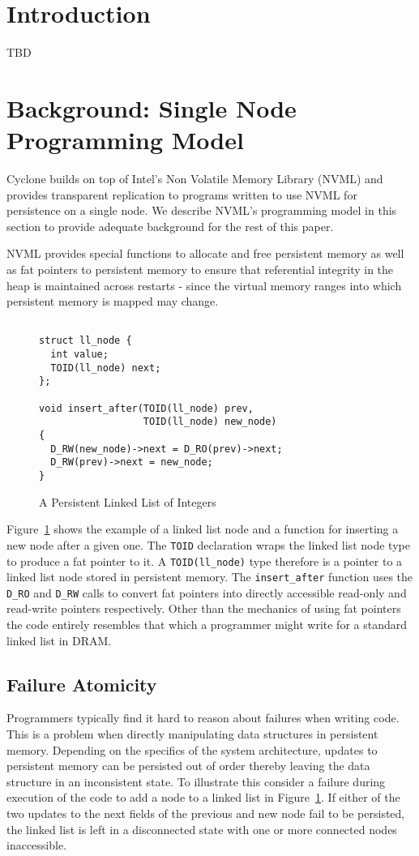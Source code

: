 \documentclass[twocolumn]{article}
\begin{document}
\section{Introduction}
TBD
\section{Background: Single Node Programming Model}
Cyclone builds on top of Intel's Non Volatile Memory Library (NVML) and provides
transparent replication to programs written to use NVML for persistence on a
single node. We describe NVML's programming model in this section to provide
adequate background for the rest of this paper.

NVML provides special functions to allocate and free persistent memory as well
as fat pointers to persistent memory to ensure that referential integrity in the
heap is maintained across restarts - since the virtual memory ranges into which
persistent memory is mapped may change.

\begin{figure}
{\scriptsize
\begin{verbatim}

struct ll_node {
  int value;
  TOID(ll_node) next;
};

void insert_after(TOID(ll_node) prev, 
                  TOID(ll_node) new_node)
{
  D_RW(new_node)->next = D_RO(prev)->next;
  D_RW(prev)->next = new_node;
}

\end{verbatim}
}
\caption{A Persistent Linked List of Integers}
\label{fig:example}
\end{figure}

Figure~\ref{fig:example} shows the example of a linked list node and a function
for inserting a new node after a given one. The {\tt TOID} declaration wraps the
linked list node type to produce a fat pointer to it. A {\tt TOID(ll\_node)}
type therefore is a pointer to a linked list node stored in persistent memory.
The {\tt insert\_after} function uses the {\tt D\_RO} and {\tt D\_RW} calls to
convert fat pointers into directly accessible read-only and read-write pointers
respectively. Other than the mechanics of using fat pointers the code entirely
resembles that which a programmer might write for a standard linked list in
DRAM.

\subsection{Failure Atomicity}
Programmers typically find it hard to reason about failures when writing
code. This is a problem when directly manipulating data structures in persistent
memory. Depending on the specifics of the system architecture, updates to
persistent memory can be persisted out of order thereby leaving the data
structure in an inconsistent state. To illustrate this consider a failure during
execution of the code to add a node to a linked list in
Figure~\ref{fig:example}. If either of the two updates to the next fields of the
previous and new node fail to be persisted, the linked list is left in a
disconnected state with one or more connected nodes inaccessible.
\end{document}
